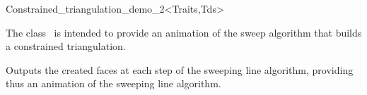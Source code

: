 

\begin{ccRefClass}{Constrained_triangulation_demo_2<Traits,Tds>}  %


\ccDefinition
  
The class \ccRefName\ is intended to provide
an animation of the sweep algorithm that builds a 
constrained triangulation.


\ccInheritsFrom
{}


\ccTypes
{}


\ccCreation
{}  %

{Outputs the created faces at each step of
the sweeping line algorithm, providing thus an animation
of the sweeping line algorithm.}


\ccSeeAlso
{}



\end{ccRefClass}


